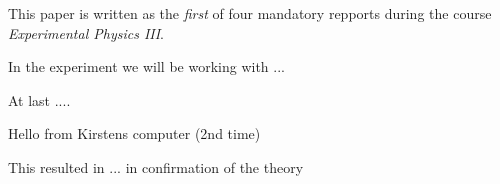 This paper is written as the \emph{first} of four mandatory repports
during the course \emph{Experimental Physics III}.

In the experiment we will be working with ... 

At last ....

Hello from Kirstens computer (2nd time)

This resulted in ...
in confirmation of the theory
